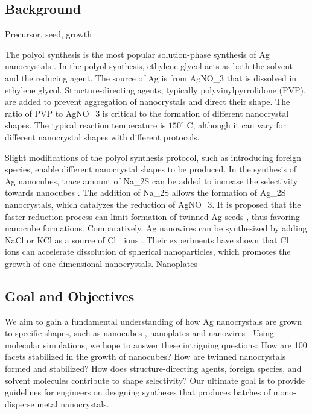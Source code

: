 \subsection{Background}

Precursor, seed, growth

The polyol synthesis is the most popular solution-phase synthesis of Ag nanocrystals \cite{Skrabalak_2007}.
In the polyol synthesis, ethylene glycol acts as both the solvent and the reducing agent.
The source of Ag is from AgNO_3 that is dissolved in ethylene glycol.
Structure-directing agents, typically polyvinylpyrrolidone (PVP), are added to prevent aggregation of nanocrystals and direct their shape.
The ratio of PVP to AgNO_3 is critical to the formation of different nanocrystal shapes.
The typical reaction temperature is $150^{\circ}$ C, although it can vary for different nanocrystal shapes with different protocols.

Slight modifications of the polyol synthesis protocol, such as introducing foreign species, enable different nanocrystal shapes to be produced.
In the synthesis of Ag nanocubes, trace amount of Na_2S can be added to increase the selectivity towards nanocubes \cite{Skrabalak_2007}.
The addition of Na_2S allows the formation of Ag_2S nanocrystals, which catalyzes the reduction of AgNO_3.
It is proposed that the faster reduction process can limit formation of twinned Ag seeds \cite{Wiley_2006}, thus favoring nanocube formations.
Comparatively, Ag nanowires can be synthesized by adding NaCl or KCl as a source of Cl$^-$ ions \cite{Tsuji_2008}.
Their experiments have shown that Cl$^-$ ions can accelerate dissolution of spherical nanoparticles, which promotes the growth of one-dimensional nanocrystals.
Nanoplates

\subsection{Goal and Objectives}

We aim to gain a fundamental understanding of how Ag nanocrystals are grown to specific shapes, such as nanocubes \cite{Im_2005}, nanoplates \cite{Lofton_2005} and nanowires \cite{Tsuji_2008}.
Using molecular simulations, we hope to answer these intriguing questions:
How are {100} facets stabilized in the growth of nanocubes?
How are twinned nanocrystals formed and stabilized?
How does structure-directing agents, foreign species, and solvent molecules contribute to shape selectivity?
Our ultimate goal is to provide guidelines for engineers on designing syntheses that produces batches of mono-disperse metal nanocrystals.


